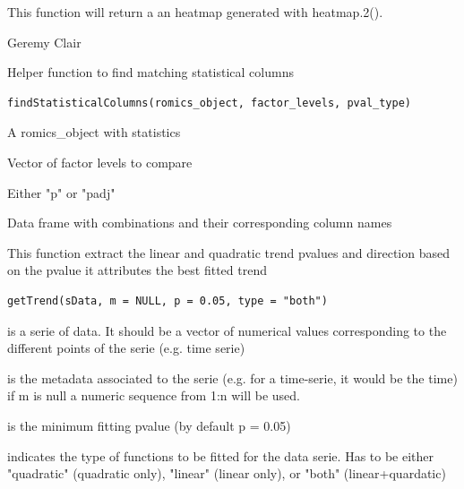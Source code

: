 \documentclass[a4paper]{book}
\begin{document}
%
\begin{Value}
This function will return a an heatmap generated with heatmap.2().
\end{Value}
%
\begin{Author}
Geremy Clair
\end{Author}
%
\begin{Description}
Helper function to find matching statistical columns
\end{Description}
%
\begin{Usage}
\begin{verbatim}
findStatisticalColumns(romics_object, factor_levels, pval_type)
\end{verbatim}
\end{Usage}
%
\begin{Arguments}
\begin{ldescription}
\item[\code{romics\_object}] A romics\_object with statistics

\item[\code{factor\_levels}] Vector of factor levels to compare

\item[\code{pval\_type}] Either "p" or "padj"
\end{ldescription}
\end{Arguments}
%
\begin{Value}
Data frame with combinations and their corresponding column names
\end{Value}
%
\begin{Description}
This function extract the linear and quadratic trend pvalues and direction based on the pvalue it attributes the best fitted trend
\end{Description}
%
\begin{Usage}
\begin{verbatim}
getTrend(sData, m = NULL, p = 0.05, type = "both")
\end{verbatim}
\end{Usage}
%
\begin{Arguments}
\begin{ldescription}
\item[\code{sData}] is a serie of data. It should be a vector of numerical values corresponding to the different points of the serie (e.g. time serie)

\item[\code{m}] is the metadata associated to the serie (e.g. for a time-serie, it would be the time) if m is null a numeric sequence from 1:n will be used.

\item[\code{p}] is the minimum fitting pvalue (by default p = 0.05)

\item[\code{type}] indicates the type of functions to be fitted for the data serie. Has to be either "quadratic" (quadratic only), "linear" (linear only), or "both" (linear+quardatic)
\end{ldescription}
\end{Arguments}
\end{document}
